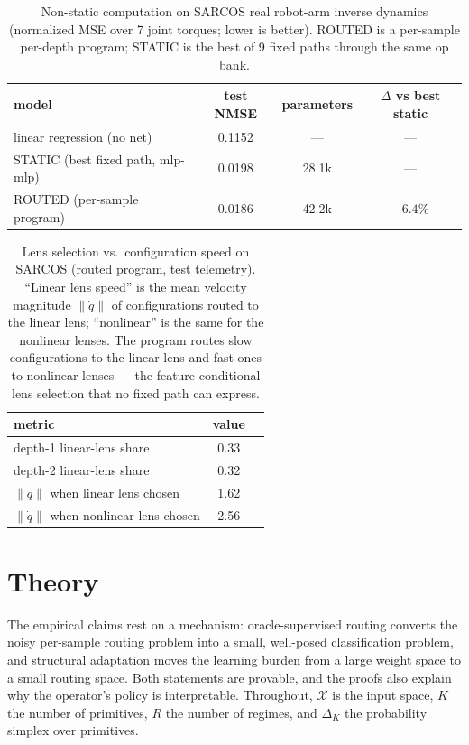 \documentclass[11pt,a4paper]{article}
\begin{document}
\begin{table}[t]
  \centering
  \caption{Non-static computation on SARCOS real robot-arm inverse dynamics
(normalized MSE over 7 joint torques; lower is better). ROUTED is a per-sample
per-depth program; STATIC is the best of 9 fixed paths through the same op
bank.}
  \label{tab:sarcos}
  \begin{tabular}{lccc}
    \toprule
    model & test NMSE & parameters & $\Delta$ vs best static \\
    \midrule
    linear regression (no net) & 0.1152 & --- & --- \\
    STATIC (best fixed path, mlp-mlp) & 0.0198 & 28.1k & --- \\
    ROUTED (per-sample program) & 0.0186 & 42.2k & $-6.4\%$ \\
    \bottomrule
  \end{tabular}
\end{table}

\begin{table}[t]
  \centering
  \caption{Lens selection vs.\ configuration speed on SARCOS (routed
program, test telemetry). ``Linear lens speed'' is the mean velocity magnitude
$\|\dot q\|$ of configurations routed to the linear lens; ``nonlinear'' is the
same for the nonlinear lenses. The program routes slow configurations to the
linear lens and fast ones to nonlinear lenses --- the feature-conditional lens
selection that no fixed path can express.}
  \label{tab:sarcoslens}
  \begin{tabular}{lcc}
    \toprule
    metric & value \\
    \midrule
    depth-1 linear-lens share & 0.33 \\
    depth-2 linear-lens share & 0.32 \\
    $\|\dot q\|$ when linear lens chosen & 1.62 \\
    $\|\dot q\|$ when nonlinear lens chosen & 2.56 \\
    \bottomrule
  \end{tabular}
\end{table}

\section{Theory}
\label{sec:theory}

The empirical claims rest on a mechanism: oracle-supervised routing converts the
noisy per-sample routing problem into a small, well-posed classification
problem, and structural adaptation moves the learning burden from a large
weight space to a small routing space. Both statements are provable, and the
proofs also explain why the operator's policy is interpretable. Throughout,
$\mathcal{X}$ is the input space, $K$ the number of primitives, $R$ the number
of regimes, and $\Delta_K$ the probability simplex over primitives.
\end{document}
